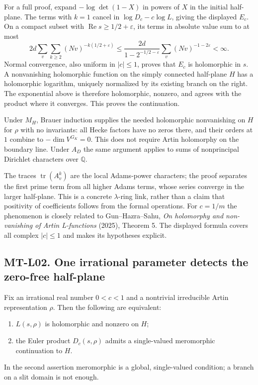 \documentclass[11pt,a4paper]{article}
\begin{document}
For a full proof, expand $-\log\det(1-X)$ in powers of $X$ in the initial
half-plane.  The terms with $k=1$ cancel in
$\log D_c-c\log L$, giving the displayed $E_c$.  On a compact subset with
$\operatorname{Re}s\ge1/2+\varepsilon$, its terms in absolute value sum to
at most
\[
 2d\sum_v\sum_{k\ge2}(Nv)^{-k(1/2+\varepsilon)}
 \le \frac{2d}{1-2^{-1/2-\varepsilon}}
       \sum_v(Nv)^{-1-2\varepsilon}<\infty.
\]
Normal convergence, also uniform in $|c|\le1$, proves that $E_c$ is
holomorphic in $s$.  A nonvanishing holomorphic function on the simply
connected half-plane $H$ has a holomorphic logarithm, uniquely normalized
by its existing branch on the right.  The exponential above is therefore
holomorphic, nonzero, and agrees with the product where it converges.
This proves the continuation.

Under $M_H$, Brauer induction supplies the needed holomorphic nonvanishing
on $H$ for $\rho$ with no invariants: all Hecke factors have no zeros
there, and their orders at $1$ combine to
$-\dim V^{G_K}=0$.  This does not require Artin holomorphy on the boundary
line.  Under $A_D$ the same argument applies to sums of nonprincipal
Dirichlet characters over $\mathbb Q$.

The traces $\operatorname{tr}(A_v^k)$ are the local Adams-power characters;
the proof separates the first prime term from all higher Adams terms,
whose series converge in the larger half-plane.  This is a concrete
$\lambda$-ring link, rather than a claim that positivity of coefficients
follows from the formal operations.  For $c=1/m$ the phenomenon is closely
related to Gun--Hazra--Sahu, \emph{On holomorphy and non-vanishing of Artin
L-functions} (2025), Theorem 5.  The displayed formula covers all complex
$|c|\le1$ and makes its hypotheses explicit.

\subsection*{MT-L02. One irrational parameter detects the zero-free half-plane}
Fix an irrational real number $0<c<1$ and a nontrivial irreducible Artin
representation $\rho$.  Then the following are equivalent:
\begin{enumerate}
 \item $L(s,\rho)$ is holomorphic and nonzero on $H$;
 \item the Euler product $D_c(s,\rho)$ admits a single-valued meromorphic
       continuation to $H$.
\end{enumerate}
In the second assertion meromorphic is a global, single-valued condition;
a branch on a slit domain is not enough.
\end{document}
